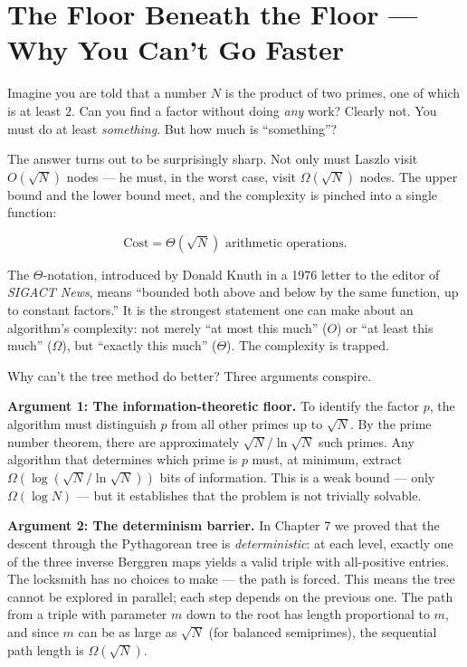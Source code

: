 \section{The Floor Beneath the Floor --- Why You Can't Go Faster}\label{ch8-the-floor-beneath-the-floor-why-you-cant-go-faster}

Imagine you are told that a number \(N\) is the product of two primes, one of which is at least \(2\). Can you find a factor without doing \emph{any} work? Clearly not. You must do at least \emph{something}. But how much is ``something''?

The answer turns out to be surprisingly sharp. Not only must Laszlo visit \(O(\sqrt{N})\) nodes --- he must, in the worst case, visit \(\Omega(\sqrt{N})\) nodes. The upper bound and the lower bound meet, and the complexity is pinched into a single function:

\[\text{Cost} = \Theta(\sqrt{N}) \text{ arithmetic operations.}\]

The \(\Theta\)-notation, introduced by Donald Knuth in a 1976 letter to the editor of \emph{SIGACT News}, means ``bounded both above and below by the same function, up to constant factors.'' It is the strongest statement one can make about an algorithm's complexity: not merely ``at most this much'' (\(O\)) or ``at least this much'' (\(\Omega\)), but ``exactly this much'' (\(\Theta\)). The complexity is trapped.

Why can't the tree method do better? Three arguments conspire.

\textbf{Argument 1: The information-theoretic floor.} To identify the factor \(p\), the algorithm must distinguish \(p\) from all other primes up to \(\sqrt{N}\). By the prime number theorem, there are approximately \(\sqrt{N} / \ln \sqrt{N}\) such primes. Any algorithm that determines which prime is \(p\) must, at minimum, extract \(\Omega(\log(\sqrt{N} / \ln \sqrt{N}))\) bits of information. This is a weak bound --- only \(\Omega(\log N)\) --- but it establishes that the problem is not trivially solvable.

\textbf{Argument 2: The determinism barrier.} In Chapter 7 we proved that the descent through the Pythagorean tree is \emph{deterministic}: at each level, exactly one of the three inverse Berggren maps yields a valid triple with all-positive entries. The locksmith has no choices to make --- the path is forced. This means the tree cannot be explored in parallel; each step depends on the previous one. The path from a triple with parameter \(m\) down to the root has length proportional to \(m\), and since \(m\) can be as large as \(\sqrt{N}\) (for balanced semiprimes), the sequential path length is \(\Omega(\sqrt{N})\).

